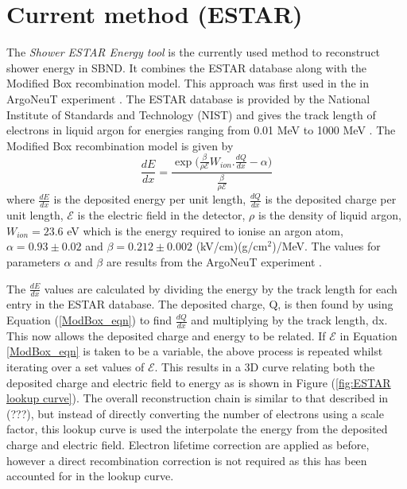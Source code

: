 \section{Current method (ESTAR)}
The \textit{Shower ESTAR Energy tool} is the currently used method to reconstruct shower energy in SBND. It combines the ESTAR database along with the Modified Box recombination model. This approach was first used in the in ArgoNeuT experiment \cite{ArgoNeuT_ESTAR_paper}. The ESTAR database is provided by the National Institute of Standards and Technology (NIST) and gives the track length of electrons in liquid argon for energies ranging from 0.01 MeV to 1000 MeV \cite{ESTAR_Database}. The Modified Box recombination model is given by \begin{equation}\label{ModBox_eqn}
    \frac{dE}{dx} = \frac{\exp{(\frac{\beta}{\rho \mathcal{E}} W_{ion}.\frac{dQ}{dx}} - \alpha)}{\frac{\beta}{\rho \mathcal{E}}}
\end{equation}
where $\frac{dE}{dx}$ is the deposited energy per unit length, $\frac{dQ}{dx}$ is the deposited charge per unit length,  $\mathcal{E}$ is the electric field in the detector, $\rho$ is the density of liquid argon, $W_{ion} = 23.6$ eV which is the energy required to ionise an argon atom, $\alpha = 0.93 \pm 0.02$ and $\beta = 0.212 \pm 0.002$ (kV/cm)(g/cm$^2$)/MeV. The values for parameters $\alpha$ and $\beta$ are results from the ArgoNeuT experiment \cite{ArgoNeuT_recombination_paper}. 

The $\frac{dE}{dx}$ values are calculated by dividing the energy by the track length for each entry in the ESTAR database. The deposited charge, Q, is then found by using Equation (\ref{ModBox_eqn}) to find $\frac{dQ}{dx}$ and multiplying by the track length, dx. This now allows the deposited charge and energy to be related. If $\mathcal{E}$ in Equation \ref{ModBox_eqn} is taken to be a variable, the above process is repeated whilst iterating over a set values of $\mathcal{E}$. This results in a 3D curve relating both the deposited charge and electric field to energy as is shown in Figure (\ref{fig:ESTAR lookup curve}). The overall reconstruction chain is similar to that described in (???), but instead of directly converting the number of electrons using a scale factor, this lookup curve is used the interpolate the energy from the deposited charge and electric field. Electron lifetime correction are applied as before, however a direct recombination correction is not required as this has been accounted for in the lookup curve. 

